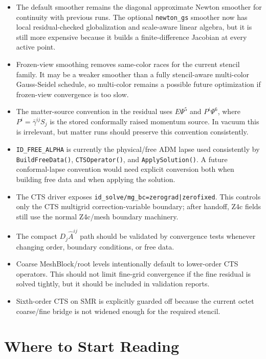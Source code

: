 \documentclass[11pt]{article}
\newcommand{\code}[1]{\texttt{#1}}
\begin{document}
\begin{itemize}
  \item The default smoother remains the diagonal approximate Newton smoother
        for continuity with previous runs.  The optional \code{newton\_gs}
        smoother now has local residual-checked globalization and scale-aware
        linear algebra, but it is still more expensive because it builds a
        finite-difference Jacobian at every active point.
  \item Frozen-view smoothing removes same-color races for the current stencil
        family.  It may be a weaker smoother than a fully stencil-aware
        multi-color Gauss-Seidel schedule, so multi-color remains a possible
        future optimization if frozen-view convergence is too slow.
  \item The matter-source convention in the residual uses \(E\Psi^5\) and
        \(P^i\Psi^6\), where \(P^i=\bar{\gamma}^{ij}S_j\) is the stored
        conformally raised momentum source.  In vacuum this is irrelevant, but
        matter runs should preserve this convention consistently.
  \item \code{ID\_FREE\_ALPHA} is currently the physical/free ADM lapse used
        consistently by \code{BuildFreeData()}, \code{CTSOperator()}, and
        \code{ApplySolution()}.  A future conformal-lapse convention would need
        explicit conversion both when building free data and when applying the
        solution.
  \item The CTS driver exposes \code{id\_solve/mg\_bc=zerograd|zerofixed}.  This
        controls only the CTS multigrid correction-variable boundary; after
        handoff, Z4c fields still use the normal Z4c/mesh boundary machinery.
  \item The compact \(D_j\hat{A}^{ij}\) path should be validated by convergence
        tests whenever changing order, boundary conditions, or free data.
  \item Coarse MeshBlock/root levels intentionally default to lower-order CTS
        operators.  This should not limit fine-grid convergence if the fine
        residual is solved tightly, but it should be included in validation
        reports.
  \item Sixth-order CTS on SMR is explicitly guarded off because the current octet
        coarse/fine bridge is not widened enough for the required stencil.
\end{itemize}

\section{Where to Start Reading}
\end{document}
